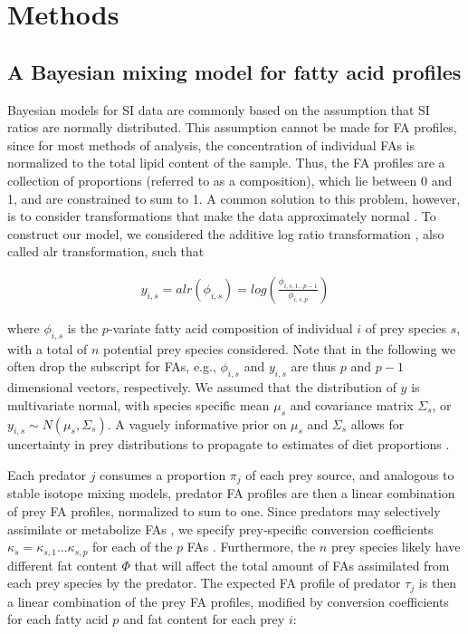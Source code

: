 \documentclass[fleqn,10pt]{wlpeerj}
\begin{document}
\section*{Methods}
\subsection*{A Bayesian mixing model for fatty acid profiles}

Bayesian models for SI data are commonly based on the assumption that
SI ratios are normally distributed. This assumption cannot be made for
FA profiles, since for most methods of analysis, the concentration of
individual FAs is normalized to the total lipid content of the
sample. Thus, the FA profiles are a collection of proportions (referred to as
a composition), which lie between 0 and 1, and are constrained to sum
to 1. A common solution to this problem, however, is to consider
transformations that make the data approximately normal
\citep{budge_studying_2006}. To construct our model, we considered the
additive log ratio transformation \citep{aitchison_convex_1999},
also called alr transformation, such that

\begin{align}
y_{i,s} = alr(\phi_{i,s}) = log \left( \frac{\phi_{i,s,1...p-1}}{\phi_{i,s,p}} \right)
\end{align}

where $\phi_{i,s}$ is the $p$-variate fatty acid composition of individual
$i$ of prey species $s$, with a total of $n$ potential prey species
considered. Note that in the following we often drop the subscript for
FAs, e.g., $\phi_{i,s}$ and $y_{i,s}$ are thus $p$ and $p-1$
dimensional vectors, respectively. We assumed that the distribution of $y$ is
multivariate normal, with species specific mean $\mu_s$ and covariance matrix $\Sigma_s$,
or $y_{i,s} \sim N(\mu_s,\Sigma_s)$. A vaguely informative prior on
$\mu_s$ and $\Sigma_s$ allows for uncertainty in prey distributions to propagate to estimates of diet proportions \citep{ward_including_2010}.

Each predator $j$ consumes a proportion $\pi_j$ of each prey source, and
analogous to stable isotope mixing models, predator FA profiles are then a
linear combination of prey FA profiles, normalized to sum to one. Since predators may selectively assimilate or metabolize FAs
\citep{iverson_quantitative_2004,budge_studying_2006,rosen_effects_2012},
we specify prey-specific conversion coefficients $\kappa_{s}
= \kappa_{s,1}...\kappa_{s,p}$ for each of the $p$ FAs \citep{rosen_effects_2012}. Furthermore,
the $n$ prey species likely have different fat content $\Phi$
that will affect the total amount of FAs assimilated from each
prey species by the
predator. The expected FA profile of predator $\tau_j$ is then a linear combination of the prey
FA profiles, modified by conversion coefficients for each fatty acid $p$ and fat
content for each prey $i$:
\end{document}
